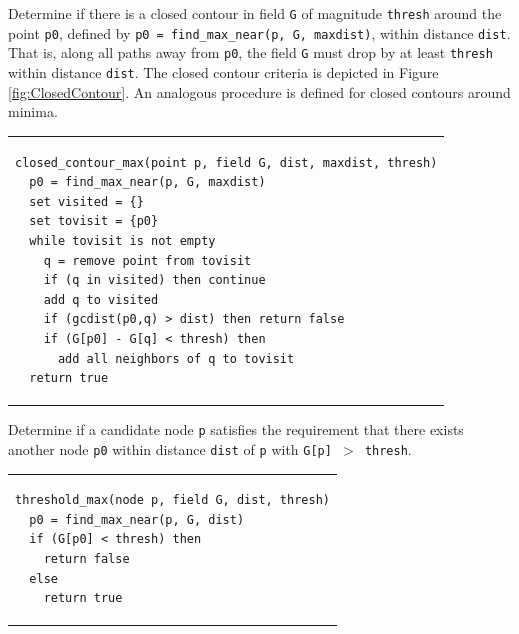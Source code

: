 \documentclass[gmdd, hvmath]{copernicus}
\begin{document}
\begin{algorithm}
\caption{Determine if there is a closed contour in field \texttt{G} of magnitude \texttt{thresh} around the point \texttt{p0}, defined by \texttt{p0 = find\_max\_near(p, G, maxdist)}, within distance \texttt{dist}.  That is, along all paths away from \texttt{p0}, the field \texttt{G} must drop by at least \texttt{thresh} within distance \texttt{dist}.  The closed contour criteria is depicted in Figure \ref{fig:ClosedContour}.  An analogous procedure is defined for closed contours around minima.\ \\} \label{alg:closed_contour_max}
\noindent \begin{tabular}{p{5in}}
\small \begin{verbatim}
closed_contour_max(point p, field G, dist, maxdist, thresh)
  p0 = find_max_near(p, G, maxdist)
  set visited = {}
  set tovisit = {p0}
  while tovisit is not empty
    q = remove point from tovisit
    if (q in visited) then continue
    add q to visited
    if (gcdist(p0,q) > dist) then return false
    if (G[p0] - G[q] < thresh) then
      add all neighbors of q to tovisit
  return true
\end{verbatim} \\
\end{tabular}
\end{algorithm}

\begin{algorithm}
\caption{Determine if a candidate node \texttt{p} satisfies the requirement that there exists another node \texttt{p0} within distance \texttt{dist} of \texttt{p} with \texttt{G[p] $>$ thresh}.\ \\} \label{alg:threshold_max}
\noindent \begin{tabular}{p{5in}}
\small \begin{verbatim}
threshold_max(node p, field G, dist, thresh)
  p0 = find_max_near(p, G, dist)
  if (G[p0] < thresh) then
    return false
  else
    return true
\end{verbatim} \\
\end{tabular}
\end{algorithm}
\end{document}

